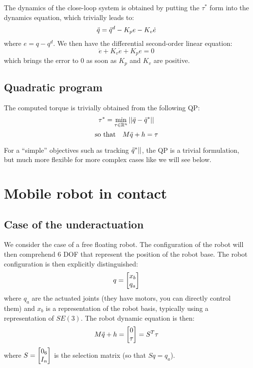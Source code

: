\documentclass{book}
\begin{document}
The dynamics of the close-loop system is obtained by putting the $\tau^*$ form into the dynamics equation, which trivially leads to:
$$ \ddot q = \ddot q^d - K_p e - K_v \dot e$$
where $e = q-q^d$. We then have the differential second-order linear equation:
$$\ddot e + K_v \dot e + K_p e = 0$$
which brings the error to 0 as soon as $K_p$ and $K_v$ are positive.

\subsection{Quadratic program}

The computed torque is trivially obtained from the following QP:
$$  \tau^* = \min_{\tau \in \mathbb{R}^n} || \ddot q - \ddot q^* || $$
$$ \textrm{so that} \quad M \ddot q + h = \tau $$

For a ``simple'' objectives such as tracking $\ddot q^*||$, the QP is a trivial formulation, but much more flexible for more complex cases like we will see below.

\section{Mobile robot in contact}

\subsection{Case of the underactuation}

We consider the case of a free floating robot. The configuration of the robot will then comprehend 6 DOF that represent the position of the robot base. The robot configuration is then explicitly distinguished:
$$ q = \begin{bmatrix} x_b \\ q_a \end{bmatrix} $$
where $q_a$ are the actuated joints (they have motors, you can directly control them) and $x_b$ is a representation of the robot basis, typically using a representation of $SE(3)$. The robot dynamic equation is then:
$$ M \ddot q + h = \begin{bmatrix} 0 \\ \tau \end{bmatrix} = S^T \tau$$
where $S = \begin{bmatrix} 0_6 \\ I_n \end{bmatrix}$ is the selection matrix (so that $S q = q_a$).
\end{document}
